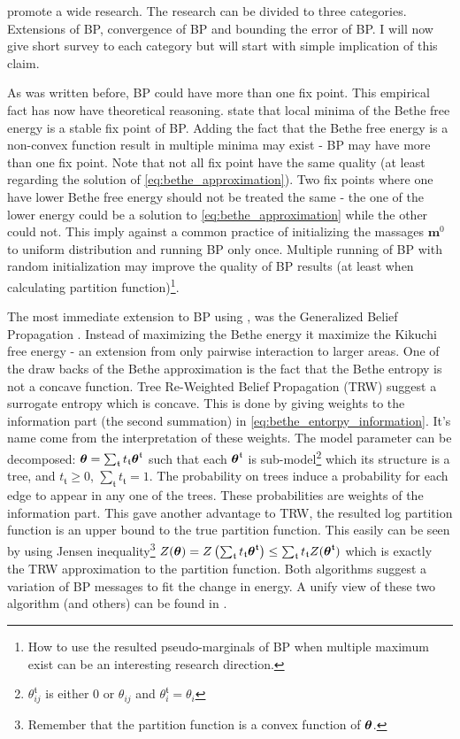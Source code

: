  promote a wide research.
The research can be divided to three categories.
Extensions of BP, convergence of BP and bounding the error of BP.
I will now give short survey to each category but will start with simple implication of this claim.

As was written before, BP could have  more than one fix point.
This empirical fact has now have theoretical reasoning. 
 state that local minima of the Bethe free energy is a stable fix point of BP.
Adding the fact that the Bethe free energy is a non-convex function result in multiple minima may exist - BP may have more than one fix point.
Note that not all fix point have the same quality (at least regarding the solution of \eqref{eq:bethe_approximation}).
Two fix points where one have lower Bethe free energy should not be treated the same - the one of the lower energy could be a solution to \eqref{eq:bethe_approximation} while the other could not.
This imply against a common practice of initializing the massages $\boldsymbol{m}^0$ to uniform distribution and running BP only once.
Multiple running of BP with random initialization may improve the quality of BP results (at least when calculating partition function)\footnote{How to use the resulted pseudo-marginals of BP when multiple maximum exist can be an interesting research direction.}.

The most immediate extension to BP using , was the Generalized Belief Propagation \cite{yedidia2000generalized}. 
Instead of maximizing the Bethe energy it maximize the Kikuchi free energy - an extension from only pairwise interaction to larger areas.
One of the draw backs of the Bethe approximation is the fact that the Bethe entropy is not a concave function.
Tree Re-Weighted Belief Propagation (TRW) \cite{wainwright2003tree} suggest a surrogate entropy  which is concave.
This is done by giving weights to the information part (the second summation) in \eqref{eq:bethe_entorpy_information}.
It's name come from the interpretation of these weights.
The model parameter can be decomposed: $\boldsymbol{\theta}=\sum_{\mathfrak{t}} t_{\mathfrak{t}}\boldsymbol{\theta}^{\mathfrak{t}}$ such that each $\boldsymbol{\theta}^{\mathfrak{t}}$ is sub-model\footnote{$\theta^{\mathfrak{t}}_{ij}$ is either $0$ or $\theta_{ij}$ and $\theta^{\mathfrak{t}}_i =\theta_i$} which its structure is a tree, and $t_{\mathfrak{t}}\geq 0$, $\sum_{\mathfrak{t}} t_{\mathfrak{t}} = 1$.
The probability on trees induce a probability for each edge to appear in any one of the trees.
These probabilities are  weights of the information part.
This gave another advantage to TRW, the resulted log partition function is an upper bound to the true partition function. 
This easily can be seen by using Jensen inequality\footnote{Remember that the partition function is a convex function of $\boldsymbol{\theta}$.} $Z(\boldsymbol{\theta}) = Z\left(\sum_{\mathfrak{t}} t_{\mathfrak{t}}\boldsymbol{\theta}^{\mathfrak{t}}\right) \leq \sum_{\mathfrak{t}} t_{\mathfrak{t}} Z(\boldsymbol{\theta}^{\mathfrak{t}})$ which is exactly the TRW approximation to the partition function.
Both algorithms suggest a variation of BP messages to fit the change in energy.
A unify view of these two algorithm (and others) can be found in \cite{meshi2009convexifying}.

